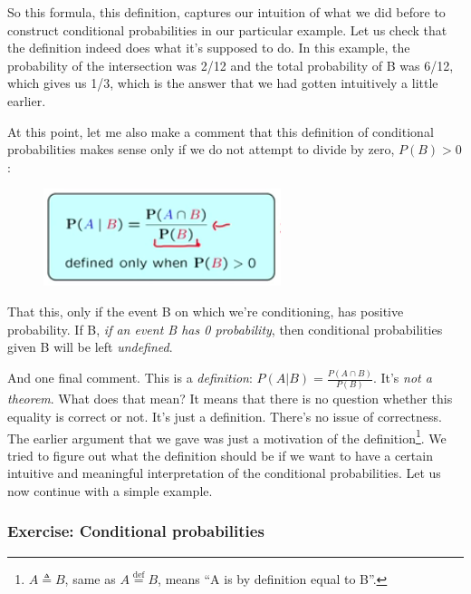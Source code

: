 \documentclass[pdftex, brazil, 12pt, twoside]{article}
\begin{document}
So this formula, this definition, captures our
intuition of what we did before to construct
conditional probabilities in our particular example.
Let us check that the definition indeed does what
it's supposed to do.
In this example, the probability of the
intersection was 2/12 and the total probability of B was
6/12, which gives us 1/3, which is the answer that we
had gotten intuitively a little earlier.

At this point, let me also make a comment that this
definition of conditional probabilities makes sense only
if we do not attempt to divide by zero, $P(B) > 0$:

\begin{figure}[H]
  \begin{center}
    \includegraphics[scale=0.6]{imagens/unit-2/lec2-009.png}%
  \end{center}
\end{figure}

That this, only if the event B on which we're conditioning,
has positive probability.
If B, \emph{if an event B has 0 probability}, then conditional
probabilities given B will be left \emph{undefined}.

And one final comment.
This is a \emph{definition}: $\displaystyle P(A | B) = \frac{P(A \cap B)}{P(B)}$.
It's \emph{not a theorem}.
What does that mean?
It means that there is no question whether this equality
is correct or not.
It's just a definition.
There's no issue of correctness.
The earlier argument that we gave was just a motivation of
the definition\footnote{$A \triangleq B$, same as $A \overset{\mathrm{def}}{=} B$,
means ``A is by definition equal to B''.}.
We tried to figure out what the definition should be if we
want to have a certain intuitive and meaningful
interpretation of the conditional probabilities.
Let us now continue with a simple example.

\subsubsection{Exercise: Conditional probabilities}
\label{un2-lec2-ex-cond-prob}
\end{document}

